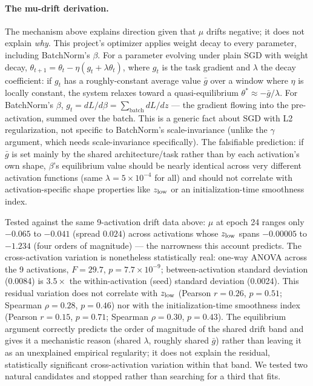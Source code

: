 \paragraph{The mu-drift derivation.} The mechanism above explains direction
given that $\mu$ drifts negative; it does not explain \emph{why}. This
project's optimizer applies weight decay to every parameter, including
BatchNorm's $\beta$. For a parameter evolving under plain SGD with weight
decay, $\theta_{t+1} = \theta_t - \eta(g_t + \lambda\theta_t)$, where $g_t$
is the task gradient and $\lambda$ the decay coefficient: if $g_t$ has a
roughly-constant average value $\bar g$ over a window where $\eta$ is
locally constant, the system relaxes toward a quasi-equilibrium
$\theta^\ast \approx -\bar g/\lambda$. For BatchNorm's $\beta$, $g_t =
dL/d\beta = \sum_{\text{batch}} dL/dz$ --- the gradient flowing into the
pre-activation, summed over the batch. This is a generic fact about SGD
with L2 regularization, not specific to BatchNorm's scale-invariance (unlike
the $\gamma$ argument, which needs scale-invariance specifically). The
falsifiable prediction: if $\bar g$ is set mainly by the shared
architecture/task rather than by each activation's own shape, $\beta$'s
equilibrium value should be nearly identical across very different
activation functions (same $\lambda=5\times10^{-4}$ for all) and should not
correlate with activation-specific shape properties like $z_{\rm low}$ or
an initialization-time smoothness index.

Tested against the same 9-activation drift data above: $\mu$ at epoch 24
ranges only $-0.065$ to $-0.041$ (spread $0.024$) across activations whose
$z_{\rm low}$ spans $-0.00005$ to $-1.234$ (four orders of magnitude) ---
the narrowness this account predicts. The cross-activation variation is
nonetheless statistically real: one-way ANOVA across the 9 activations,
$F=29.7$, $p=7.7\times10^{-9}$; between-activation standard deviation
(0.0084) is $3.5\times$ the within-activation (seed) standard deviation
(0.0024). This residual variation does not correlate with $z_{\rm low}$
(Pearson $r=0.26$, $p=0.51$; Spearman $\rho=0.28$, $p=0.46$) nor with the
initialization-time smoothness index (Pearson $r=0.15$, $p=0.71$; Spearman
$\rho=0.30$, $p=0.43$). The equilibrium argument correctly predicts the
order of magnitude of the shared drift band and gives it a mechanistic
reason (shared $\lambda$, roughly shared $\bar g$) rather than leaving it
as an unexplained empirical regularity; it does not explain the residual,
statistically significant cross-activation variation within that band. We
tested two natural candidates and stopped rather than searching for a
third that fits.

